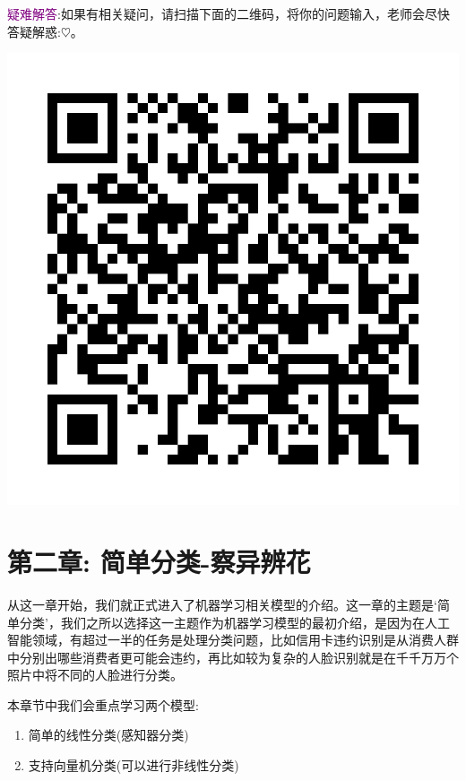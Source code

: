 \documentclass[12pt]{article}
\numberwithin{figure}{section}
\numberwithin{equation}{section}
\begin{document}
\noindent
\textcolor{purple}{疑难解答}:如果有相关疑问，请扫描下面的二维码，将你的问题输入，老师会尽快答疑解惑:$\heartsuit$。 \begin{marginfigure}
	\centering
	\includegraphics[width=\textwidth]{fig/C1C3qrcode}
\end{marginfigure}



\newpage
\setcounter{section}{2}
\part*{第二章: 简单分类-察异辨花}

从这一章开始，我们就正式进入了机器学习相关模型的介绍。这一章的主题是`简单分类'，我们之所以选择这一主题作为机器学习模型的最初介绍，是因为在人工智能领域，有超过一半的任务是处理分类问题，比如信用卡违约识别是从消费人群中分别出哪些消费者更可能会违约，再比如较为复杂的人脸识别就是在千千万万个照片中将不同的人脸进行分类。

本章节中我们会重点学习两个模型:
\begin{enumerate}
	\item 简单的线性分类(感知器分类)
	\item 支持向量机分类(可以进行非线性分类)
\end{enumerate}
\end{document}
